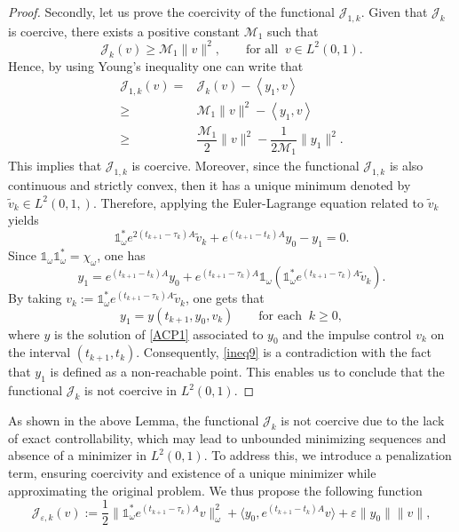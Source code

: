 \documentclass[sn-mathphys]{sn-jnl}
\begin{document}
\begin{proof}
    Secondly, let us prove the coercivity of the functional \(\mathcal{J}_{1,k}\). Given that \(\mathcal{J}_k\) is coercive, there exists a positive constant $\mathcal{M}_1$ such that
    \[\mathcal{J}_k(v) \geq \mathcal{M}_1 \|v\|^2, \qquad \text{for all} \;\; v\in L^2(0,1).\]
    Hence, by using Young's inequality one can write that
    \begin{align*}
        \mathcal{J}_{1,k}(v) 
        = &\mathcal{J}_k(v) - \left\langle y_1 , v \right\rangle\\
        \geq &\mathcal{M}_1 \|v\|^2 -\left\langle y_1 , v \right\rangle\\
        \geq &\dfrac{\mathcal{M}_1}{2} \|v\|^2 - \dfrac{1}{2 \mathcal{M}_1} \|y_1\|^2.
    \end{align*}
    This implies that \(\mathcal{J}_{1,k}\) is coercive. Moreover, since the functional \(\mathcal{J}_{1,k}\) is also continuous and strictly convex, then it has a unique minimum denoted by \(\tilde{v}_k \in L^2(0,1,)\). Therefore, applying the Euler-Lagrange equation related to $\tilde{v}_k$ yields
    \[\mathds{1}_{\omega}^{*} e^{2(t_{k+1}-\tau_k)A} \tilde{v}_k + e^{(t_{k+1}-t_k)A} y_0 - y_1=0.\]
    Since \(\mathds{1}_{\omega} \mathds{1}^{*}_{\omega} = \chi_{\omega}\), one has
    \[y_1= e^{(t_{k+1}-t_k)A} y_0 + e^{(t_{k+1}-\tau_k)A}\mathds{1}_{\omega} \left(\mathds{1}^{*}_{\omega} e^{(t_{k+1}-\tau_k)A} \tilde{v}_k\right).\]
    By taking \(v_k := \mathds{1}^{*}_{\omega} e^{(t_{k+1}-\tau_k)A} \tilde{v}_k\), one gets that 
    \begin{equation}\label{ineq9}
        y_1= y(t_{k+1}, y_0, v_k) \qquad \text{for each} \;\; k \geq 0,
    \end{equation}
    where $y$ is the solution of \eqref{ACP1} associated to $y_0$ and the impulse control $v_k$ on the interval $(t_{k+1}, t_k)$. Consequently, \eqref{ineq9} is a contradiction with the fact that $y_1$ is defined as a non-reachable point. This enables us to conclude that the functional \(\mathcal{J}_k\) is not coercive in \(L^2(0,1)\).
    \end{proof}
 As shown in the above Lemma, the functional $\mathcal{J}_k$ is not coercive due to the lack of exact controllability, which may lead to unbounded minimizing sequences and absence of a minimizer in $L^2(0,1)$. To address this, we introduce a penalization term, ensuring coercivity and existence of a unique minimizer while approximating the original problem. We thus propose the following function
\[\mathcal{J}_{\varepsilon,k}(v) := \dfrac{1}{2}\|\mathds{1}_{\omega}^*e^{(t_{k+1}-\tau_k)A}v\|_{\omega}^2+\langle y_0,e^{(t_{k+1}-t_k)A}v\rangle + \varepsilon \|y_0\|\|v\|,\]
\end{document}
